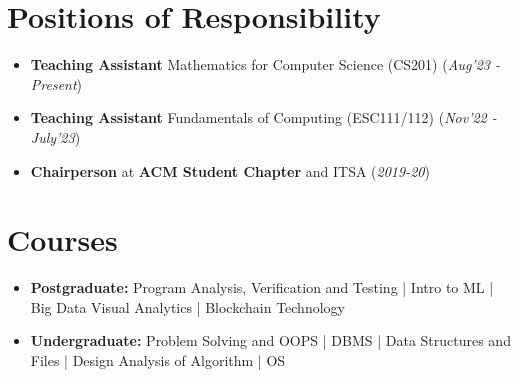 \documentclass[10.8pt, a4paper]{extarticle}
\newcommand{\shorterSection}[1]{\vspace{-10pt}\section{#1}}
\begin{document}
\shorterSection{Positions of Responsibility}
\vspace{-2pt}
\begin{itemize}
    \item \textbf{Teaching Assistant} Mathematics for Computer Science (CS201) \hfill\hfill(\textit{Aug'23 - Present})
    \item \textbf{Teaching Assistant} Fundamentals of Computing (ESC111/112) \hfill\hfill(\textit{Nov'22 - July'23})
    \item \textbf{Chairperson} at \textbf{ACM Student Chapter} and ITSA \hfill\hfill(\textit{2019-20})
\end{itemize}

\shorterSection{Courses}
\vspace{-2pt}
\begin{itemize}
  \item \textbf{Postgraduate:}
    Program Analysis, Verification and Testing |
    Intro to ML |
    Big Data Visual Analytics |
    Blockchain Technology
  \item \textbf{Undergraduate:}
    Problem Solving and OOPS |
    DBMS |
    Data Structures and Files |
    Design Analysis of Algorithm |
    OS
\end{itemize}
\end{document}
